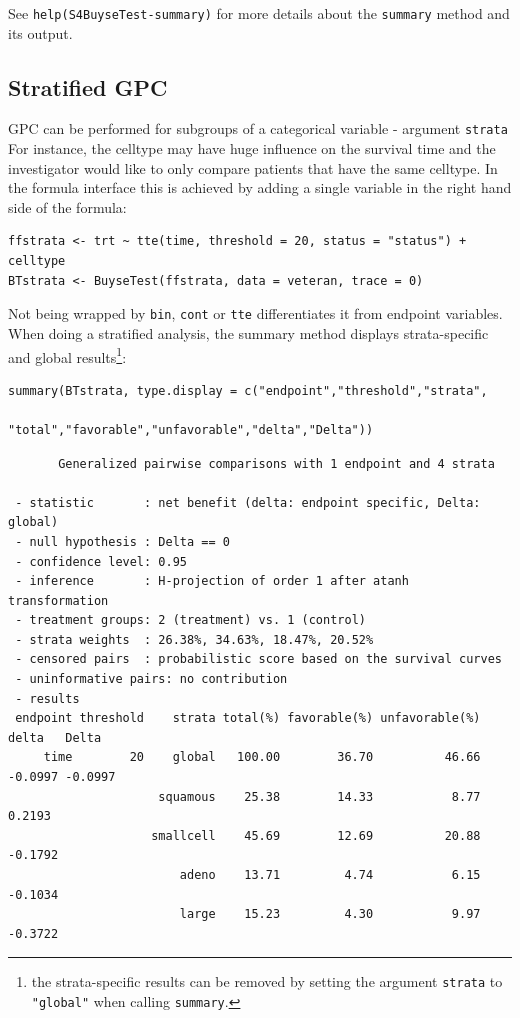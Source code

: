 \documentclass[12pt]{article}
\begin{document}
See \texttt{help(S4BuyseTest-summary)} for more details about the \texttt{summary}
method and its output.

\clearpage

\subsection{Stratified GPC}
\label{sec:org852d5bd}

GPC can be performed for subgroups of a categorical variable \hfill -
argument \texttt{strata} \newline For instance, the celltype may have huge
influence on the survival time and the investigator would like to only
compare patients that have the same celltype. In the formula interface
this is achieved by adding a single variable in the right hand side of
the formula:
\lstset{language=r,label= ,caption= ,captionpos=b,numbers=none}
\begin{lstlisting}
ffstrata <- trt ~ tte(time, threshold = 20, status = "status") + celltype
BTstrata <- BuyseTest(ffstrata, data = veteran, trace = 0)
\end{lstlisting}

Not being wrapped by \texttt{bin}, \texttt{cont} or \texttt{tte} differentiates it from
endpoint variables. When doing a stratified analysis, the summary
method displays strata-specific and global results\footnote{the
strata-specific results can be removed by setting the argument
\texttt{strata} to \texttt{"global"} when calling \texttt{summary}.}:
\lstset{language=r,label= ,caption= ,captionpos=b,numbers=none}
\begin{lstlisting}
summary(BTstrata, type.display = c("endpoint","threshold","strata",
                                   "total","favorable","unfavorable","delta","Delta"))
\end{lstlisting}

\begin{verbatim}
       Generalized pairwise comparisons with 1 endpoint and 4 strata

 - statistic       : net benefit (delta: endpoint specific, Delta: global) 
 - null hypothesis : Delta == 0 
 - confidence level: 0.95 
 - inference       : H-projection of order 1 after atanh transformation 
 - treatment groups: 2 (treatment) vs. 1 (control) 
 - strata weights  : 26.38%, 34.63%, 18.47%, 20.52% 
 - censored pairs  : probabilistic score based on the survival curves
 - uninformative pairs: no contribution
 - results
 endpoint threshold    strata total(%) favorable(%) unfavorable(%)   delta   Delta
     time        20    global   100.00        36.70          46.66 -0.0997 -0.0997
                     squamous    25.38        14.33           8.77  0.2193        
                    smallcell    45.69        12.69          20.88 -0.1792        
                        adeno    13.71         4.74           6.15 -0.1034        
                        large    15.23         4.30           9.97 -0.3722
\end{verbatim}
\end{document}
